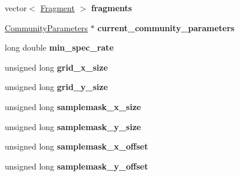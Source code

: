 \begin{DoxyCompactItemize}
\item 
vector$<$ \hyperlink{struct_fragment}{Fragment} $>$ {\bfseries fragments}\hypertarget{group___community_objects_a8a17909b92a0cec3b63cec41e92796cb}{}\label{group___community_objects_a8a17909b92a0cec3b63cec41e92796cb}

\item 
\hyperlink{struct_community_parameters}{Community\+Parameters} $\ast$ {\bfseries current\+\_\+community\+\_\+parameters}\hypertarget{group___community_objects_a77e925f82bee5441d8ec45406066dcfb}{}\label{group___community_objects_a77e925f82bee5441d8ec45406066dcfb}

\item 
long double {\bfseries min\+\_\+spec\+\_\+rate}\hypertarget{group___community_objects_a9dc6f7d4ab75b382be85c2b74edac6b7}{}\label{group___community_objects_a9dc6f7d4ab75b382be85c2b74edac6b7}

\item 
unsigned long {\bfseries grid\+\_\+x\+\_\+size}\hypertarget{group___community_objects_a383dba82c8c76bf5c130c2bf4ac057e5}{}\label{group___community_objects_a383dba82c8c76bf5c130c2bf4ac057e5}

\item 
unsigned long {\bfseries grid\+\_\+y\+\_\+size}\hypertarget{group___community_objects_a308d12fa4ef95015860d4181b075c93f}{}\label{group___community_objects_a308d12fa4ef95015860d4181b075c93f}

\item 
unsigned long {\bfseries samplemask\+\_\+x\+\_\+size}\hypertarget{group___community_objects_a960bb6bb58eaec017d36d16cb3a3bc8a}{}\label{group___community_objects_a960bb6bb58eaec017d36d16cb3a3bc8a}

\item 
unsigned long {\bfseries samplemask\+\_\+y\+\_\+size}\hypertarget{group___community_objects_a10722b2fe8855460946f04f0ae69fd74}{}\label{group___community_objects_a10722b2fe8855460946f04f0ae69fd74}

\item 
unsigned long {\bfseries samplemask\+\_\+x\+\_\+offset}\hypertarget{group___community_objects_ac4985481c86bd62a50fa946699867216}{}\label{group___community_objects_ac4985481c86bd62a50fa946699867216}

\item 
unsigned long {\bfseries samplemask\+\_\+y\+\_\+offset}\hypertarget{group___community_objects_aeaebe975a46d62b70380e50ff7ebd09a}{}\label{group___community_objects_aeaebe975a46d62b70380e50ff7ebd09a}


\end{DoxyCompactItemize}

